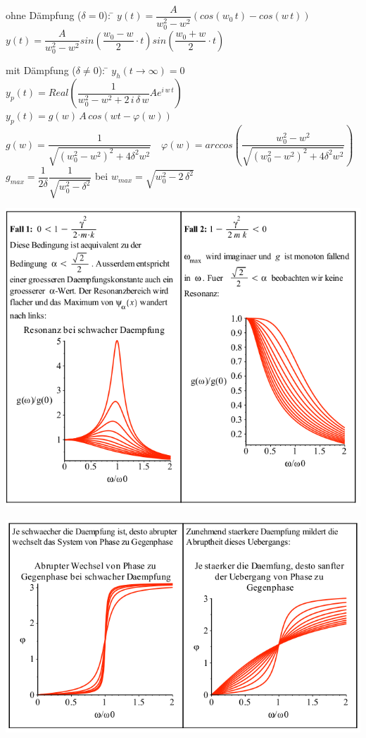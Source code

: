 \begin{tabbing}
ohne Dämpfung ($\delta = 0$): \= $y(t) = \dfrac{A}{w_0^2-w^2}(cos(w_0\,t)-cos(w\,t))$\\
\> $y(t) = \dfrac{A}{w_0^2-w^2}sin(\dfrac{w_0-w}{2} \cdot t)sin(\dfrac{w_0+w}{2} \cdot t)$\\
\end{tabbing}

\begin{tabbing}
mit Dämpfung ($\delta \neq 0$): \= $y_h(t \rightarrow \infty) = 0$\\
\> $y_p(t)= Real\left(\dfrac{1}{w_0^2-w^2 + 2\,i\,\delta\,w}Ae^{i\,w\,t}\right)$\\
\> $y_p(t)= g(w)\,A\,cos(wt-\varphi(w))$\\
\> $g(w)=\dfrac{1}{\sqrt{(w_0^2-w^2)^2+4\delta^2w^2}} \quad \varphi(w)=arccos(\dfrac{w_0^2-w^2}{\sqrt{(w_0^2-w^2)^2+4\delta^2w^2}})$\\
\> $g_{max}=\dfrac{1}{2\delta} \dfrac{1}{\sqrt{w_0^2-\delta^2}}$ bei $w_{max}=\sqrt{w_0^2-2\,\delta^2}$
\end{tabbing}
\begin{minipage}[h]{0.5\textwidth} 
	\includegraphics[width=1.0\textwidth]{images/Erzwungen1.png}
\end{minipage}
\begin{minipage}[h]{0.5\textwidth}
	\includegraphics[width=1.0\textwidth]{images/Erzwungen2.png}
\end{minipage}